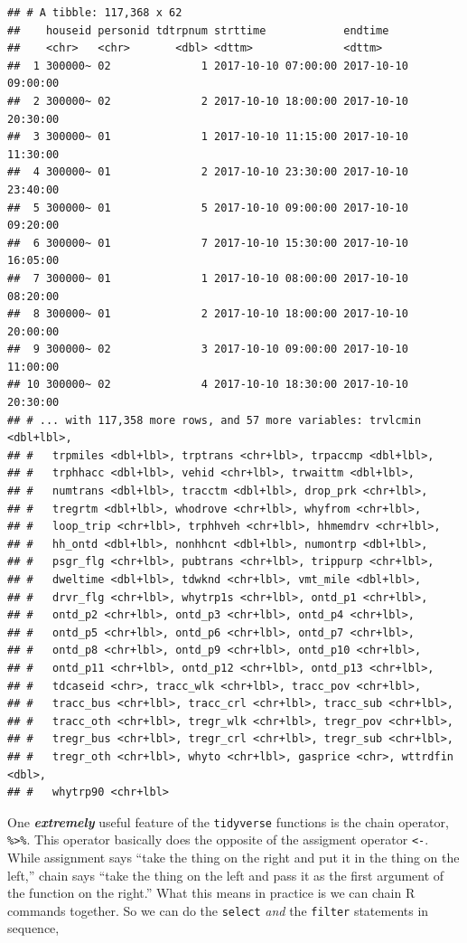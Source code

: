 \documentclass[
]{book}
\begin{document}
\begin{verbatim}
## # A tibble: 117,368 x 62
##    houseid personid tdtrpnum strttime            endtime            
##    <chr>   <chr>       <dbl> <dttm>              <dttm>             
##  1 300000~ 02              1 2017-10-10 07:00:00 2017-10-10 09:00:00
##  2 300000~ 02              2 2017-10-10 18:00:00 2017-10-10 20:30:00
##  3 300000~ 01              1 2017-10-10 11:15:00 2017-10-10 11:30:00
##  4 300000~ 01              2 2017-10-10 23:30:00 2017-10-10 23:40:00
##  5 300000~ 01              5 2017-10-10 09:00:00 2017-10-10 09:20:00
##  6 300000~ 01              7 2017-10-10 15:30:00 2017-10-10 16:05:00
##  7 300000~ 01              1 2017-10-10 08:00:00 2017-10-10 08:20:00
##  8 300000~ 01              2 2017-10-10 18:00:00 2017-10-10 20:00:00
##  9 300000~ 02              3 2017-10-10 09:00:00 2017-10-10 11:00:00
## 10 300000~ 02              4 2017-10-10 18:30:00 2017-10-10 20:30:00
## # ... with 117,358 more rows, and 57 more variables: trvlcmin <dbl+lbl>,
## #   trpmiles <dbl+lbl>, trptrans <chr+lbl>, trpaccmp <dbl+lbl>,
## #   trphhacc <dbl+lbl>, vehid <chr+lbl>, trwaittm <dbl+lbl>,
## #   numtrans <dbl+lbl>, tracctm <dbl+lbl>, drop_prk <chr+lbl>,
## #   tregrtm <dbl+lbl>, whodrove <chr+lbl>, whyfrom <chr+lbl>,
## #   loop_trip <chr+lbl>, trphhveh <chr+lbl>, hhmemdrv <chr+lbl>,
## #   hh_ontd <dbl+lbl>, nonhhcnt <dbl+lbl>, numontrp <dbl+lbl>,
## #   psgr_flg <chr+lbl>, pubtrans <chr+lbl>, trippurp <chr+lbl>,
## #   dweltime <dbl+lbl>, tdwknd <chr+lbl>, vmt_mile <dbl+lbl>,
## #   drvr_flg <chr+lbl>, whytrp1s <chr+lbl>, ontd_p1 <chr+lbl>,
## #   ontd_p2 <chr+lbl>, ontd_p3 <chr+lbl>, ontd_p4 <chr+lbl>,
## #   ontd_p5 <chr+lbl>, ontd_p6 <chr+lbl>, ontd_p7 <chr+lbl>,
## #   ontd_p8 <chr+lbl>, ontd_p9 <chr+lbl>, ontd_p10 <chr+lbl>,
## #   ontd_p11 <chr+lbl>, ontd_p12 <chr+lbl>, ontd_p13 <chr+lbl>,
## #   tdcaseid <chr>, tracc_wlk <chr+lbl>, tracc_pov <chr+lbl>,
## #   tracc_bus <chr+lbl>, tracc_crl <chr+lbl>, tracc_sub <chr+lbl>,
## #   tracc_oth <chr+lbl>, tregr_wlk <chr+lbl>, tregr_pov <chr+lbl>,
## #   tregr_bus <chr+lbl>, tregr_crl <chr+lbl>, tregr_sub <chr+lbl>,
## #   tregr_oth <chr+lbl>, whyto <chr+lbl>, gasprice <chr>, wttrdfin <dbl>,
## #   whytrp90 <chr+lbl>
\end{verbatim}

One \textbf{\emph{extremely}} useful feature of the \texttt{tidyverse} functions is the chain
operator, \texttt{\%\textgreater{}\%}. This operator basically does the opposite of the assigment
operator \texttt{\textless{}-}. While assignment says ``take the thing on the right and put it in
the thing on the left,'' chain says ``take the thing on the left and pass it as
the first argument of the function on the right.'' What this means in practice is
we can chain R commands together. So we can do the \texttt{select} \emph{and} the \texttt{filter}
statements in sequence,
\end{document}

